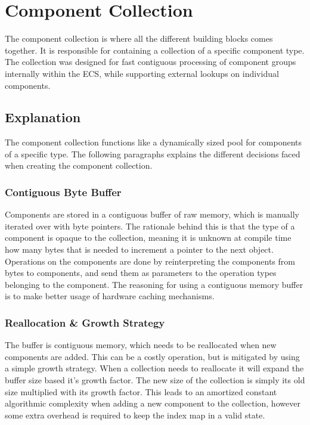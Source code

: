\section{Component Collection}
\label{subsec:detailed_component_collection}
The component collection is where all the different building blocks comes together.
It is responsible for containing a collection of a specific component type.
The collection was designed for fast contiguous processing of component groups internally within the ECS,
while supporting external lookups on individual components.

\subsection{Explanation}
The component collection functions like a dynamically sized pool for components of a specific type.
The following paragraphs explains the different decisions faced when creating the component collection.

\subsubsection{Contiguous Byte Buffer}
Components are stored in a contiguous buffer of raw memory,
which is manually iterated over with byte pointers.
The rationale behind this is that the type of a component is opaque
to the collection, meaning it is unknown at compile time
how many bytes that is needed to increment a pointer to the next object.
Operations on the components are done by reinterpreting the components from bytes to components,
and send them as parameters to the operation types belonging to the component.
The reasoning for using a contiguous memory buffer is to make better usage of hardware caching mechanisms.

\subsubsection{Reallocation \& Growth Strategy}
\label{par:detailed_component_collection_reallocation_growth}
The buffer is contiguous memory, which needs to be reallocated when new components are added.
This can be a costly operation, but is mitigated by using a simple growth strategy.
When a collection needs to reallocate it will expand the buffer size based it's growth factor.
The new size of the collection is simply its old size multiplied with its growth factor.
This leads to an amortized constant algorithmic complexity when adding a new component to the collection,
however some extra overhead is required to keep the index map in a valid state.

